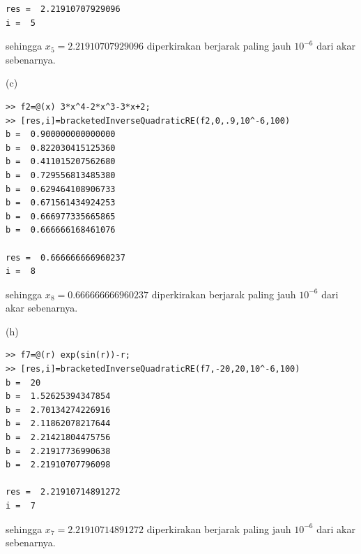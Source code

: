 \begin{description}
\begin{verbatim}
res =  2.21910707929096
i =  5
\end{verbatim}sehingga $x_{5}=2.21910707929096$ diperkirakan berjarak paling jauh
$10^{-6}$ dari akar sebenarnya.
\item [{\ref{exc:bracketing-11}:}] (c) \begin{verbatim}
>> f2=@(x) 3*x^4-2*x^3-3*x+2;
>> [res,i]=bracketedInverseQuadraticRE(f2,0,.9,10^-6,100)
b =  0.900000000000000
b =  0.822030415125360
b =  0.411015207562680
b =  0.729556813485380
b =  0.629464108906733
b =  0.671561434924253
b =  0.666977335665865
b =  0.666666168461076

res =  0.666666666960237
i =  8
\end{verbatim}sehingga $x_{8}=0.666666666960237$ diperkirakan berjarak paling jauh
$10^{-6}$ dari akar sebenarnya.

(h) \begin{verbatim}
>> f7=@(r) exp(sin(r))-r;
>> [res,i]=bracketedInverseQuadraticRE(f7,-20,20,10^-6,100)
b =  20
b =  1.52625394347854
b =  2.70134274226916
b =  2.11862078217644
b =  2.21421804475756
b =  2.21917736990638
b =  2.21910707796098

res =  2.21910714891272
i =  7
\end{verbatim}sehingga $x_{7}=2.21910714891272$ diperkirakan berjarak paling jauh
$10^{-6}$ dari akar sebenarnya.
\end{description}

